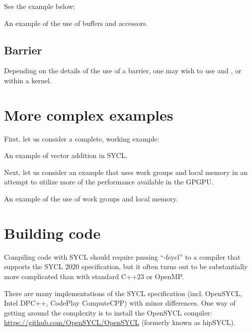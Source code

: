 See the example below:
\raggedbottom
\begin{codebox}[]{\href{https://godbolt.org/z/Ksf8MT7Ef}{\ExternalLink}}
\footnotesize An example of the use of buffers and accessors.
\tcblower
{}
\end{codebox}

\subsection{Barrier}

Depending on the details of the use of a barrier, one may wish to use  and , or  within a kernel.


\section{More complex examples}

First, let us consider a complete, working example:

\raggedbottom
\begin{codebox}[]{\href{https://godbolt.org/z/GvqboePx7}{\ExternalLink}}
\footnotesize An example of vector addition in SYCL.
\tcblower
{}
\end{codebox}

Next, let us consider an example that uses work groups and local memory in an attempt to utilize more of the performance available in the GPGPU. 

\raggedbottom
\begin{codebox}[]{\href{https://godbolt.org/z/qf1K6o7dn}{\ExternalLink}}
\footnotesize An example of the use of work groups and local memory.
\tcblower
{}
\end{codebox}
         
\section{Building code}

Compiling code with SYCL should require passing ``-fsycl'' to a compiler that supports the SYCL 2020 specification, 
but it often turns out to be substantially more complicated than with standard C++23 or OpenMP.

There are many implementations of the SYCL specification (incl. OpenSYCL, Intel DPC++, CodePlay ComputeCPP)
with minor differences. 
One way of getting around the complexity is to install the OpenSYCL compiler:
\url{https://github.com/OpenSYCL/OpenSYCL} (formerly known as hipSYCL).  

